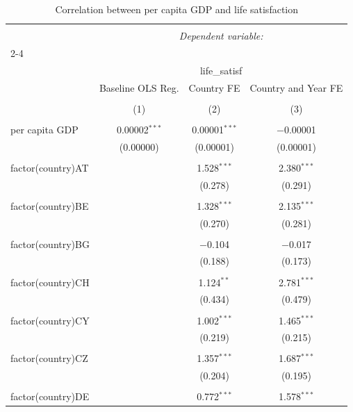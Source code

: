 
\begin{table}[!htbp] \centering 
  \caption{Correlation between per capita GDP and life satisfaction} 
  \label{} 
\begin{tabular}{@{\extracolsep{5pt}}lccc} 
\\[-1.8ex]\hline 
\hline \\[-1.8ex] 
 & \multicolumn{3}{c}{\textit{Dependent variable:}} \\ 
\cline{2-4} 
\\[-1.8ex] & \multicolumn{3}{c}{life\_satisf} \\ 
 & Baseline OLS Reg. & Country FE & Country and Year FE \\ 
\\[-1.8ex] & (1) & (2) & (3)\\ 
\hline \\[-1.8ex] 
 per capita GDP & 0.00002$^{***}$ & 0.00001$^{***}$ & $-$0.00001 \\ 
  & (0.00000) & (0.00001) & (0.00001) \\ 
  & & & \\ 
 factor(country)AT &  & 1.528$^{***}$ & 2.380$^{***}$ \\ 
  &  & (0.278) & (0.291) \\ 
  & & & \\ 
 factor(country)BE &  & 1.328$^{***}$ & 2.135$^{***}$ \\ 
  &  & (0.270) & (0.281) \\ 
  & & & \\ 
 factor(country)BG &  & $-$0.104 & $-$0.017 \\ 
  &  & (0.188) & (0.173) \\ 
  & & & \\ 
 factor(country)CH &  & 1.124$^{**}$ & 2.781$^{***}$ \\ 
  &  & (0.434) & (0.479) \\ 
  & & & \\ 
 factor(country)CY &  & 1.002$^{***}$ & 1.465$^{***}$ \\ 
  &  & (0.219) & (0.215) \\ 
  & & & \\ 
 factor(country)CZ &  & 1.357$^{***}$ & 1.687$^{***}$ \\ 
  &  & (0.204) & (0.195) \\ 
  & & & \\ 
 factor(country)DE &  & 0.772$^{***}$ & 1.578$^{***}$ \\ 

\end{tabular}
\end{table}
